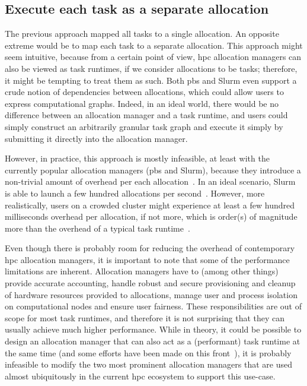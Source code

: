 \subsection*{Execute each task as a separate allocation}
The previous approach mapped all tasks to a single allocation. An opposite extreme would be to map
each task to a separate allocation. This approach might seem intuitive, because from a certain
point of view, \gls{hpc} allocation managers can also be viewed as task runtimes,
if we consider allocations to be tasks; therefore, it might be tempting to treat them as such. Both
\gls{pbs} and Slurm even support a crude notion of dependencies between
allocations, which could allow users to express computational graphs. Indeed, in an ideal world,
there would be no difference between an allocation manager and a task runtime, and users could
simply construct an arbitrarily granular task graph and execute it simply by submitting it directly
into the allocation manager.

However, in practice, this approach is mostly infeasible, at least with the currently popular
allocation managers (\gls{pbs} and Slurm), because they introduce a non-trivial
amount of overhead per each allocation~\cite{falkon}. In an ideal scenario, Slurm is
able to launch a few hundred allocations per second~\cite{slurm-throughput}. However, more
realistically, users on a crowded cluster might experience at least a few hundred milliseconds
overhead per allocation, if not more, which is order(s) of magnitude more than the overhead of a
typical task runtime~\cite{rsds}.

Even though there is probably room for reducing the overhead of contemporary
\gls{hpc} allocation managers, it is important to note that some of the
performance limitations are inherent. Allocation managers have to (among other things) provide
accurate accounting, handle robust and secure provisioning and cleanup of hardware resources
provided to allocations, manage user and process isolation on computational nodes and ensure user
fairness. These responsibilities are out of scope for most task runtimes, and therefore it is not
surprising that they can usually achieve much higher performance. While in theory, it could be
possible to design an allocation manager that can also act as a (performant) task runtime at the
same time (and some efforts have been made on this front~\cite{flux}), it is
probably infeasible to modify the two most prominent allocation managers that are used almost
ubiquitously in the current \gls{hpc} ecosystem to support this use-case.

